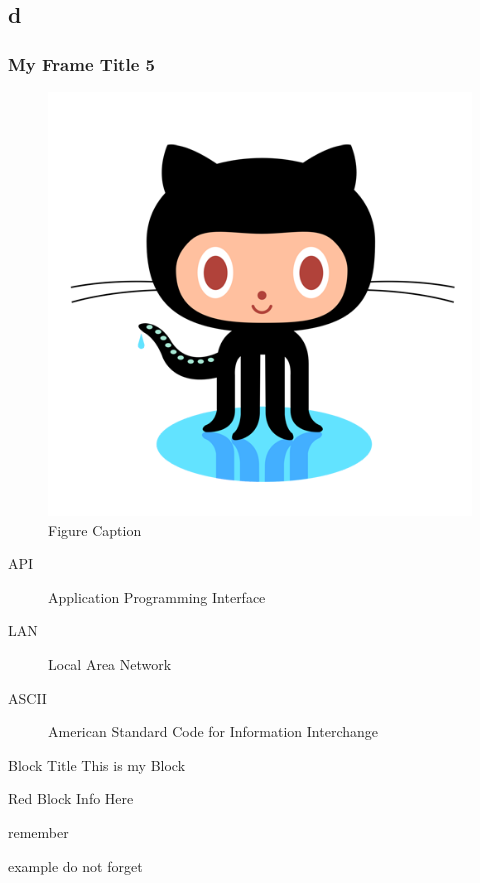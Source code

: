 \documentclass{beamer} %
\begin{document}
\subsection{d} 
\begin{frame}
\frametitle{My Frame Title 5}
	\begin{figure}
	\includegraphics[scale=.4]{git.png}
	\caption{Figure Caption}
	\end{figure}
\end{frame}

\begin{frame}
	\begin{description}
	\item[API] Application Programming Interface
	\item[LAN] Local Area Network
	\item[ASCII] American Standard Code for Information Interchange
	\end{description}
\end{frame}

\begin{frame}
	\begin{block}{Block Title}
	This is my Block
	\end{block}
	\begin{alertblock}{Red Block}
	Info Here
	\end{alertblock} 
	\begin{definition}
	remember 
	\end{definition}
	\begin{example}
	example do not forget 
	\end{example}
\end{frame}
\end{document}

